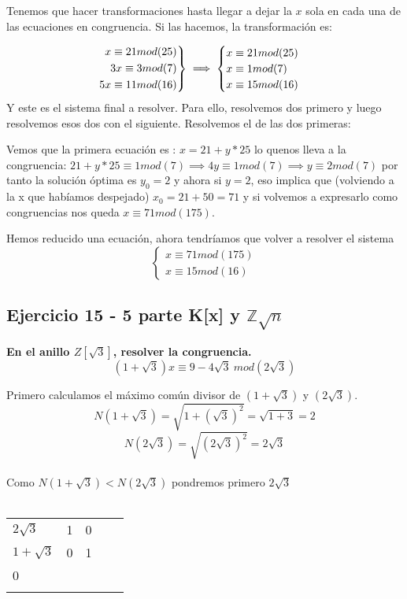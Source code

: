 \documentclass[11pt, a4paper, titlepage]{article}
\providecommand{\ent}{\mathbb{Z}}
\newenvironment{rcases}
  {\left.\begin{aligned}}
  {\end{aligned}\right\rbrace}
\begin{document}
Tenemos que hacer transformaciones hasta llegar a dejar la $x$ sola en cada una de las ecuaciones en congruencia. Si las hacemos, la transformación es:



\[
\begin{rcases}
	x \equiv 21 mod(25)\\
	3x \equiv 3 mod(7)\\
	5x \equiv 11 mod(16)
\end{rcases} \implies \begin{cases}
	 x \equiv 21 mod(25)\\
	 x \equiv 1 mod(7)\\
	 x \equiv 15 mod(16)
\end{cases}
\]
Y este es el sistema final a resolver. Para ello, resolvemos dos primero y luego resolvemos esos dos con el siguiente. Resolvemos el de las dos primeras:

Vemos que la primera ecuación es : $x = 21+y*25$ lo quenos lleva a la congruencia: $21 +y*25 \equiv 1 mod(7) \implies 4y \equiv 1 mod(7) \implies y \equiv 2 mod(7)$ por tanto la solución óptima es $y_0 = 2$ y ahora si $y=2$, eso implica que (volviendo a la x que habíamos despejado) $x_0 = 21+50 = 71$ y si volvemos a expresarlo como congruencias nos queda $x \equiv 71 mod(175)$. 

Hemos reducido una ecuación, ahora tendríamos que volver a resolver el sistema
\[
\begin{cases}
	x \equiv 71 mod(175)\\
	x \equiv 15 mod(16)
\end{cases}
\]



\subsection{\LARGE{Ejercicio 15 - 5 parte K[x] y $\ent\sqrt{n}$}}

\textbf{En el anillo $Z[\sqrt3]$, resolver la congruencia.
$$ (1+ \sqrt3)x \equiv 9 - 4\sqrt3 \ mod(2\sqrt3)$$}

Primero calculamos el máximo común divisor de $(1 + \sqrt 3)$ y $(2\sqrt3)$.\\
$$ N(1 + \sqrt3) = \sqrt{1 + {(\sqrt3)}^{2}} = \sqrt{1 + 3} = 2 $$
$$ N(2 \sqrt 3) = \sqrt{{(2\sqrt3)}^{2}} =  2\sqrt3 $$\\
Como $N(1 + \sqrt3) < N(2 \sqrt 3)$ pondremos primero $2 \sqrt3$\\ \\
\begin{tabular}{lllll}
\multicolumn{1}{l|}{$2\sqrt3$}    & 1 & 0 &  &  \\
\multicolumn{1}{l|}{$1 + \sqrt3$} & 0 & 1 &  &  \\
\multicolumn{1}{l|}{0} &   &   &  &  \\
                                &   &   &  & 
\end{tabular}
\end{document}
